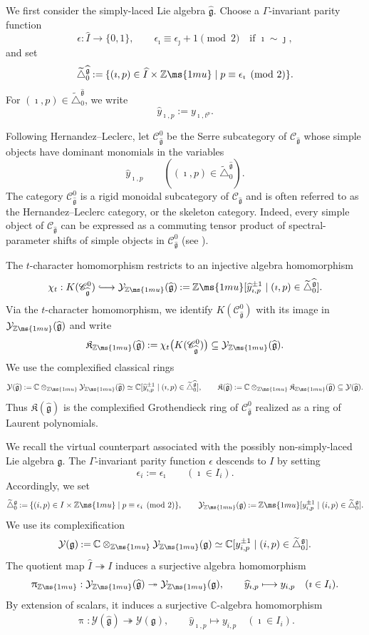\documentclass[12pt, leqno]{amsart}
\numberwithin{equation}{section}
\theoremstyle{plain}
\theoremstyle{definition}
\newcommand{\seteq}{\mathbin{:=}}
\newcommand{\g}{\mathfrak{g}}
\newcommand{\C}{\mathbb{C}}
\newcommand{\Z}{\mathbb{Z}\ms{1mu}}
\newcommand{\Dynkin}{\triangle}
\newcommand{\im}{\imath}
\newcommand{\jm}{\jmath}
\newcommand{\hI}{\widehat{I}}
\newcommand{\hg}{{\widehat{\g}}}
\newcommand{\hy}{\widehat{y}}
\newcommand{\frakK}{\mathfrak{K}}
\newcommand{\calY}{\mathcal{Y}}
\newcommand{\scrC}{\mathscr{C}}
\newcommand{\tDynkin}{{\widetilde{\Dynkin}}}
\begin{document}
We first consider the simply-laced Lie algebra $\hg$.  Choose a
$\Gamma$-invariant parity function
\[
\epsilon:\hI\longrightarrow\{0,1\}, \qquad \epsilon_{\im}\equiv\epsilon_{\jm}+1\pmod 2
\quad\text{if }\im\sim\jm,
\]
and set
\[
\tDynkin_0^\hg \seteq \{(\im,p)\in\hI\times\Z \mid p\equiv\epsilon_{\im}\pmod 2\}.
\]
For $(\im,p)\in\tDynkin_0^\hg$, we write
\[
\hy_{\im,p}\seteq y_{\im,t^p}.
\]

Following Hernandez--Leclerc, let $\scrC_\hg^0$ be the Serre
subcategory of $\scrC_\hg$ whose simple objects have dominant
monomials in the variables
\[
\hy_{\im,p} \qquad ((\im,p)\in\tDynkin_0^\hg).
\]
The category $\scrC_\hg^0$ is a rigid monoidal subcategory of
$\scrC_\hg$ and is often referred to as the Hernandez--Leclerc
category, or the skeleton category.  Indeed, every simple object of
$\scrC_\hg$ can be expressed as a commuting tensor product of
spectral-parameter shifts of simple objects in $\scrC_\hg^0$
(see \cite{HL10,HL16,FHOO}).

The $t$-character homomorphism restricts to an injective algebra
homomorphism
\[
\chi_t: K(\scrC_\hg^0) \lhook\joinrel\longrightarrow
\calY_{\Z}(\hg) \seteq \Z[\hy_{\im,p}^{\pm1}\mid(\im,p)\in\tDynkin_0^\hg].
\]
Via the $t$-character homomorphism, we identify
$K(\scrC_\hg^0)$ with its image in $\calY_{\Z}(\hg)$ and write
\[
\frakK_{\Z}(\hg) \seteq \chi_t\bigl(K(\scrC_\hg^0)\bigr)
\subseteq \calY_{\Z}(\hg).
\]
We use the complexified classical rings
\[
\calY(\hg) \seteq \C\otimes_{\Z}\calY_{\Z}(\hg)
\simeq \C[\hy_{\im,p}^{\pm1}\mid(\im,p)\in\tDynkin_0^\hg],
\qquad
\frakK(\hg) \seteq \C\otimes_{\Z}\frakK_{\Z}(\hg)
\subseteq \calY(\hg).
\]
Thus $\frakK(\hg)$ is the complexified Grothendieck ring of
$\scrC_\hg^0$ realized as a ring of Laurent polynomials.

We recall the virtual counterpart associated with the possibly
non-simply-laced Lie algebra $\g$.  The $\Gamma$-invariant parity function
$\epsilon$ descends to $I$ by setting
\[
\epsilon_i\seteq\epsilon_{\im} \qquad (\im\in I_i).
\]
Accordingly, we set
\[
\tDynkin_0^\g \seteq \{(i,p)\in I\times\Z \mid p\equiv\epsilon_i\pmod 2\},
\qquad
\calY_{\Z}(\g) \seteq \Z[y_{i,p}^{\pm1}\mid(i,p)\in\tDynkin_0^\g].
\]
We use its complexification
\[
\calY(\g) \seteq \C\otimes_{\Z}\calY_{\Z}(\g)
\simeq \C[y_{i,p}^{\pm1}\mid(i,p)\in\tDynkin_0^\g].
\]
The quotient map $\hI\twoheadrightarrow I$ induces a surjective
algebra homomorphism
\[
\uppi_{\Z}: \calY_{\Z}(\hg)\twoheadrightarrow\calY_{\Z}(\g),
\qquad \hy_{\im,p}\longmapsto y_{i,p} \quad (\im\in I_i).
\]
By extension of scalars, it induces a surjective $\C$-algebra
homomorphism
\begin{align} \label{eq: uppi}
\uppi: \calY(\hg)\twoheadrightarrow\calY(\g), \qquad \hy_{\im,p}\longmapsto y_{i,p} \quad (\im\in I_i).
\end{align}
\end{document}
